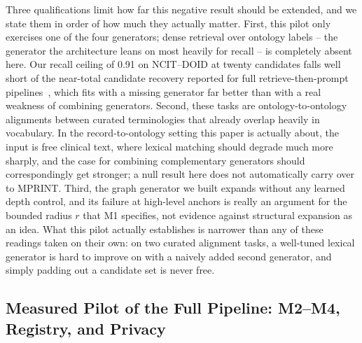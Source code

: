 \documentclass[conference]{IEEEtran}
\begin{document}
Three qualifications limit how far this negative result should be extended, and we state them in order of how much they actually matter. First, this pilot only exercises one of the four generators; dense retrieval over ontology labels -- the generator the architecture leans on most heavily for recall -- is completely absent here. Our recall ceiling of 0.91 on NCIT--DOID at twenty candidates falls well short of the near-total candidate recovery reported for full retrieve-then-prompt pipelines~\cite{b54}, which fits with a missing generator far better than with a real weakness of combining generators. Second, these tasks are ontology-to-ontology alignments between curated terminologies that already overlap heavily in vocabulary. In the record-to-ontology setting this paper is actually about, the input is free clinical text, where lexical matching should degrade much more sharply, and the case for combining complementary generators should correspondingly get stronger; a null result here does not automatically carry over to MPRINT. Third, the graph generator we built expands without any learned depth control, and its failure at high-level anchors is really an argument for the bounded radius $r$ that M1 specifies, not evidence against structural expansion as an idea. What this pilot actually establishes is narrower than any of these readings taken on their own: on two curated alignment tasks, a well-tuned lexical generator is hard to improve on with a naively added second generator, and simply padding out a candidate set is never free.

\subsection{Measured Pilot of the Full Pipeline: M2--M4, Registry, and Privacy}
\label{sec:fullpilot}
\end{document}
